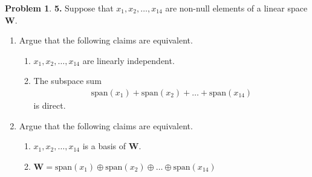 \documentclass{book}
\theoremstyle{definition}
\newtheorem*{prob*}{Problem}
\newcommand{\W}{\mathbf{W}}
\newcommand{\xpan}{\text{span}}
\begin{document}
\newpage




\begin{prob*} \textbf{5.} Suppose that $x_1, x_2,\dots,x_{14}$ are non-null elements of a linear space $\W$. 
	\begin{enumerate}
		\item Argue that the following claims are equivalent. 
		\begin{enumerate}
			\item $x_1, x_2,\dots,x_{14}$ are linearly independent. 
			\item The subspace sum 
			\begin{align*}
			\xpan(x_1) + \xpan(x_2) + \dots + \xpan(x_{14})
			\end{align*}
			is direct. 
		\end{enumerate}
		\item Argue that the following claims are equivalent.
		\begin{enumerate}
			\item $x_1, x_2,\dots,x_{14}$  is a basis of $\W$.
			\item $\W = \xpan(x_1) \oplus \xpan(x_2) \oplus \dots \oplus \xpan(x_{14})$
		\end{enumerate}
	\end{enumerate}


\end{prob*}


\newpage
\end{document}
